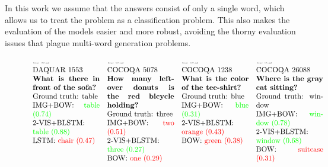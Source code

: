 \documentclass{article} \usepackage{nips15submit_e,times}
\renewcommand{\#}[1]{\textbf{#1}}
\begin{document}
In this work we assume that the answers consist of only a single word,
which allows us to treat the problem as a classification problem. This also
makes the evaluation of the models easier and more robust, avoiding the thorny
evaluation issues that plague multi-word generation problems.

\begin{figure}
\centering
\scriptsize
$\begin{array}{p{3.2cm} p{3.2cm} p{3.2cm} p{3.2cm}}

\scalebox{0.23}{
\texttt{[image: 1553.jpg]}}

\parbox{3.2cm}{
\vskip 0.05in
DAQUAR 1553\\
\textbf{What is there in front of the sofa?}\\
Ground truth: table\\
IMG+BOW: \textcolor{green}{table (0.74)}\\
2-VIS+BLSTM: \textcolor{green}{table (0.88) }\\
LSTM: \textcolor{red}{chair (0.47) }
}
&

\scalebox{0.23}{
\texttt{[image: 5078.jpg]}}

\parbox{3.2cm}{
\vskip 0.05in
COCOQA 5078\\
\textbf{How many leftover donuts is the red bicycle holding?}\\
Ground truth: three\\
IMG+BOW: \textcolor{red}{two (0.51)}\\
2-VIS+BLSTM: \textcolor{green}{three (0.27)}\\
BOW: \textcolor{red}{one (0.29)}
}
&

\scalebox{0.23}{
\texttt{[image: 1238.jpg]}}

\parbox{3.2cm}{
\vskip 0.05in
COCOQA 1238\\
\textbf{What is the color of the tee-shirt?}\\
Ground truth: blue\\
IMG+BOW: \textcolor{green}{blue (0.31) }\\
2-VIS+BLSTM: \textcolor{red}{orange (0.43) }\\
BOW: \textcolor{red}{green (0.38) }
}
&

\scalebox{0.23}{
\texttt{[image: 135.jpg]}}

\parbox{3.2cm}{
\vskip 0.05in
COCOQA 26088\\
\textbf{Where is the gray cat sitting?}\\
Ground truth: window\\
IMG+BOW: \textcolor{green}{window (0.78) }\\
2-VIS+BLSTM: \textcolor{green}{window (0.68) }\\
BOW: \textcolor{red}{suitcase (0.31) }
}
\end{array}$


\end{figure}
\end{document}
